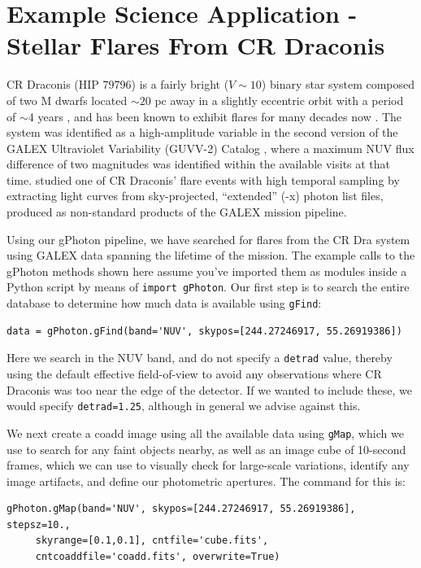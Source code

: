 \documentclass[preprint]{aastex}
\begin{document}
\section{Example Science Application - Stellar Flares From CR Draconis}
\label{scienceexamples}
CR Draconis (HIP 79796) is a fairly bright ($V \sim 10$) binary star system composed of two M dwarfs located $\sim 20$ pc away in a slightly eccentric orbit with a period of $\sim 4$ years \citep{tam2008}, and has been known to exhibit flares for many decades now \citep{cri1970}. The system was identified as a high-amplitude variable in the second version of the GALEX Ultraviolet Variability (GUVV-2) Catalog \citep{whe2008}, where a maximum NUV flux difference of two magnitudes was identified within the available visits at that time. \citet{wel2006} studied one of CR Draconis' flare events with high temporal sampling by extracting light curves from sky-projected, ``extended'' (-x) photon list files, produced as non-standard products of the GALEX mission pipeline.

Using our gPhoton pipeline, we have searched for flares from the CR Dra system using GALEX data spanning the lifetime of the mission.  The example calls to the gPhoton methods shown here assume you've imported them as modules inside a Python script by means of \texttt{import gPhoton}. Our first step is to search the entire database to determine how much data is available using \texttt{gFind}:

\begin{verbatim}
data = gPhoton.gFind(band='NUV', skypos=[244.27246917, 55.26919386])
\end{verbatim}

Here we search in the NUV band, and do not specify a \texttt{detrad} value, thereby using the default effective field-of-view to avoid any observations where CR Draconis was too near the edge of the detector.  If we wanted to include these, we would specify \texttt{detrad=1.25}, although in general we advise against this.

We next create a coadd image using all the available data using \texttt{gMap}, which we use to search for any faint objects nearby, as well as an image cube of 10-second frames, which we can use to visually check for large-scale variations, identify any image artifacts, and define our photometric apertures.  The command for this is:

\begin{verbatim}
gPhoton.gMap(band='NUV', skypos=[244.27246917, 55.26919386], stepsz=10.,
     skyrange=[0.1,0.1], cntfile='cube.fits',
     cntcoaddfile='coadd.fits', overwrite=True)
\end{verbatim}
\end{document}
